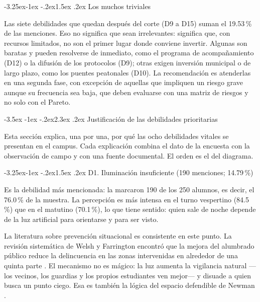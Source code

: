 \documentclass[11pt,a4paper]{article}
\makeatletter
\renewcommand\section{\@startsection{section}{1}{\z@}%
  {-3.5ex \@plus -1ex \@minus -.2ex}{2.3ex \@plus .2ex}%
  {\normalfont\Large\bfseries\color{uazblue}}}
\renewcommand\subsection{\@startsection{subsection}{2}{\z@}%
  {-3.25ex\@plus -1ex \@minus -.2ex}{1.5ex \@plus .2ex}%
  {\normalfont\large\bfseries\color{uazblue!85!black}}}
\makeatother
\begin{document}
\subsection{Los muchos triviales}

Las siete debilidades que quedan después del corte (D9 a D15) suman el
19.53\,\% de las menciones. Eso no significa que sean irrelevantes: significa
que, con recursos limitados, no son el primer lugar donde conviene invertir.
Algunas son baratas y pueden resolverse de inmediato, como el programa de
acompañamiento (D12) o la difusión de los protocolos (D9); otras exigen
inversión municipal o de largo plazo, como los puentes peatonales (D10). La
recomendación es atenderlas en una segunda fase, con excepción de aquellas que
impliquen un riesgo grave aunque su frecuencia sea baja, que deben evaluarse con
una matriz de riesgos y no solo con el Pareto.

\section{Justificación de las debilidades prioritarias}

Esta sección explica, una por una, por qué las ocho debilidades vitales se
presentan en el campus. Cada explicación combina el dato de la encuesta con la
observación de campo y con una fuente documental. El orden es el del diagrama.

\subsection{D1. Iluminación insuficiente (190 menciones; 14.79\,\%)}

Es la debilidad más mencionada: la marcaron 190 de los 250 alumnos, es decir, el
76.0\,\% de la muestra. La percepción es más intensa en el turno vespertino
(84.5\,\%) que en el matutino (70.1\,\%), lo que tiene sentido: quien sale de
noche depende de la luz artificial para orientarse y para ser visto.

La literatura sobre prevención situacional es consistente en este punto. La
revisión sistemática de Welsh y Farrington encontró que la mejora del alumbrado
público reduce la delincuencia en las zonas intervenidas en alrededor de una
quinta parte \cite{welsh2008}. El mecanismo no es mágico: la luz aumenta la
vigilancia natural ---los vecinos, los guardias y los propios estudiantes ven
mejor--- y disuade a quien busca un punto ciego. Esa es también la lógica del
espacio defendible de Newman \cite{newman1972}.
\end{document}
